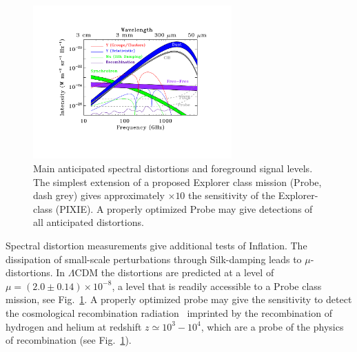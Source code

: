 \begin{figure}[ht!]
\hspace{-0.2in}
\parbox{4.0in}{\centerline {
\includegraphics[width=3.0in]{Figures/probe_spectral_foregrounds_v2.pdf} } }
\hspace{-0.05in}
\parbox{2.5in}{
\caption{ \small \setlength{\baselineskip}{0.95\baselineskip}
Main anticipated spectral distortions and foreground signal levels. The simplest extension of a proposed
Explorer class mission (Probe, dash grey) gives approximately $\times10$ the sensitivity of the Explorer-class (PIXIE). 
A properly optimized Probe may give detections of all anticipated distortions.  
\label{fig:distortions} } }
\vspace{-0.1in}
\end{figure}

Spectral distortion measurements give additional tests of Inflation. The dissipation of small-scale 
perturbations through Silk-damping \cite{Sunyaev1970diss, Daly1991, Hu1994, Chluba2012} leads to $\mu$-distortions. 
In $\Lambda$CDM the distortions are predicted at a level of $\mu=(2.0\pm0.14)\times 10^{-8}$, a level that 
is readily accessible to a Probe class mission, see Fig.~\ref{fig:distortions}\cite{Chluba2012, Chluba2016LCDM}. 
A properly optimized probe may give the sensitivity to detect the cosmological recombination 
radiation~\citep{Sunyaev2009, Chluba2016} imprinted by the recombination of hydrogen and helium 
at redshift $z\simeq 10^3-10^4$, which are a probe of the physics of recombination (see Fig.~\ref{fig:distortions}). 


